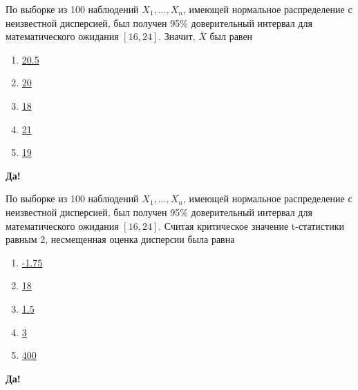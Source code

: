 \documentclass[t]{beamer}
\begin{document}
 \begin{frame} \label{35-Yes} 
\begin{block}{35} 

  По выборке из 100 наблюдений $X_1,\ldots,X_{n}$, имеющей нормальное распределение с неизвестной дисперсией, был получен 95\% доверительный интервал для математического ожидания $[16,24]$. Значит, $\bar{X}$ был равен


 \end{block} 
\begin{enumerate} 
\item[] \hyperlink{35-No}{\beamergotobutton{} 20.5}
\item[] \hyperlink{35-Yes}{\beamergotobutton{} 20}
\item[] \hyperlink{35-No}{\beamergotobutton{} 18}
\item[] \hyperlink{35-No}{\beamergotobutton{} 21}
\item[] \hyperlink{35-No}{\beamergotobutton{} 19}
\end{enumerate} 

 \textbf{Да!} 
 \hyperlink{36}{}\end{frame} 


 \begin{frame} \label{36-Yes} 
\begin{block}{36} 

  По выборке из 100 наблюдений $X_1,\ldots,X_{n}$, имеющей нормальное распределение с неизвестной дисперсией, был получен 95\% доверительный интервал для математического ожидания $[16,24]$. Считая критическое значение t-статистики равным 2, несмещенная оценка дисперсии была равна


 \end{block} 
\begin{enumerate} 
\item[] \hyperlink{36-No}{\beamergotobutton{} -1.75}
\item[] \hyperlink{36-No}{\beamergotobutton{} 18}
\item[] \hyperlink{36-No}{\beamergotobutton{} 1.5}
\item[] \hyperlink{36-No}{\beamergotobutton{} 3}
\item[] \hyperlink{36-Yes}{\beamergotobutton{} 400}
\end{enumerate} 

 \textbf{Да!} 
 \hyperlink{37}{}\end{frame} 
\end{document}

